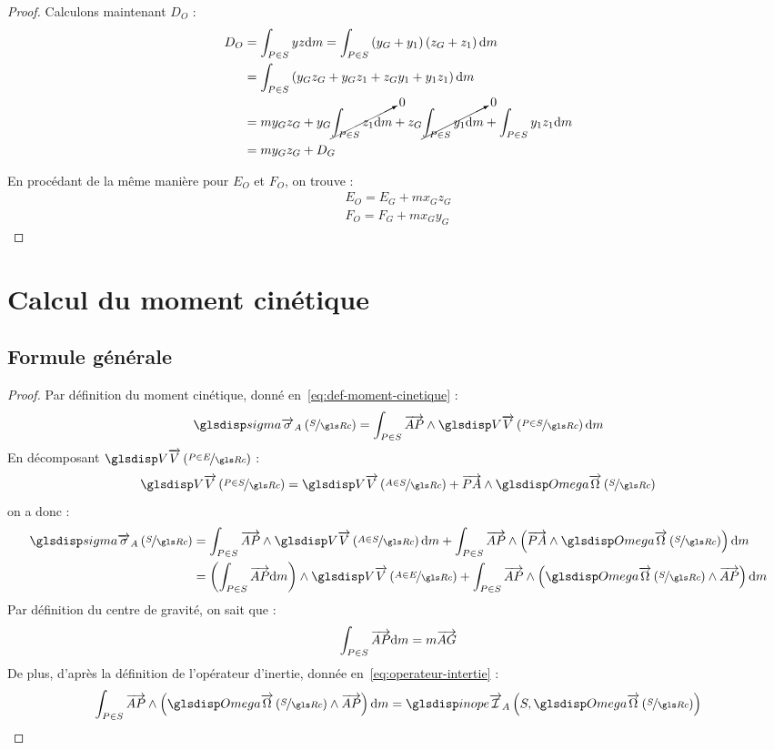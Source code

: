 \begin{proof}
	
	Calculons maintenant $D_O$ :
	\begin{align*}
		D_O	&=\int_{P\in S}yz\mathrm{d}m=\int_{P\in S}\left(y_G+y_1\right)\left(z_G+z_1\right)\mathrm{d}m\\
			&=\int_{P\in S}\left(y_Gz_G+y_Gz_1+z_Gy_1+y_1z_1\right)\mathrm{d}m\\
			&=my_Gz_G+y_G\cancelto{0}{\int_{P\in S}z_1\mathrm{d}m}+z_G\cancelto{0}{\int_{P\in S}y_1\mathrm{d}m}+\int_{P\in S}y_1z_1\mathrm{d}m\\
			&=my_Gz_G+D_G
	\end{align*}

		En procédant de la même manière pour $E_O$ et $F_O$, on trouve :
	\begin{subequations}
		\begin{align}
			E_O=E_G+mx_Gz_G\\		
			F_O=F_G+mx_Gy_G		
		\end{align}
	\end{subequations}
\end{proof}

\section{Calcul du moment cinétique}
	\subsection{Formule générale}
	\begin{theorem}
	\end{theorem}
	\begin{proof}
		Par définition du moment cinétique, donné en~\eqref{eq:def-moment-cinetique} :
		\begin{equation*}
			\mcin{A}{S}=\ints{\vect{AP}\wedge\V{P}{S}}
		\end{equation*}
		En décomposant $\V{P}{E}$ :
		\begin{equation*}
			\V{P}{S}=\V{A}{S}+\vect{PA}\wedge\Om{S}
		\end{equation*}
		on a donc :
		\begin{align*}
			\mcin{A}{S}	&=\ints{\vect{AP}\wedge\V{A}{S}}+\ints{\vect{AP}\wedge\left(\vect{PA}\wedge\Om{S}\right)}\\
						&=\left(\ints{\vect{AP}}\right)\wedge\V{A}{E}+\ints{\vect{AP}\wedge\left(\Om{S}\wedge\vect{AP}\right)} 
		\end{align*}
		Par définition du centre de gravité, on sait que :
		\begin{equation*}
			\int_{P\in S}\overrightarrow{AP}\mathrm{d}m=m\overrightarrow{AG}
		\end{equation*}
		De plus, d'après la définition de l'opérateur d'inertie, donnée en~\eqref{eq:operateur-intertie} :
		\begin{equation}
			\ints{\vect{AP}\wedge\left(\Om{S}\wedge\vect{AP}\right)}=\inope[A]{S}{\Om{S}}
			\label{eq:calcul-moment-cinetique}
		\end{equation}
	\end{proof}
	
